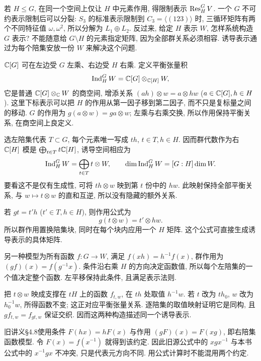 若 $H\le G$, 在同一个空间上仅让 $H$ 中元素作用, 得限制表示 $\operatorname{Res}_H^G V$. 一个 $G$ 不可约表示限制后可以分裂: $S_3$ 的标准表示限制到 $C_3=\langle(123)\rangle$ 时, 三循环矩阵有两个不同特征值 $\omega,\omega^2$, 所以分解为 $L_1\oplus L_2$. 反过来, 给定 $H$ 表示 $W$, 怎样系统构造 $G$ 表示? 不能随意给 $G\setminus H$ 的元素指定矩阵, 因为全部群关系必须相容. 诱导表示通过为每个陪集安放一份 $W$ 来解决这个问题.

$\mathbb C[G]$ 可在左边受 $G$ 左乘、右边受 $H$ 右乘. 定义平衡张量积
\[
 \operatorname{Ind}_H^G W=\mathbb C[G]\otimes_{\mathbb C[H]}W,
\]
它是普通 $\mathbb C[G]\otimes_\mathbb C W$ 的商空间, 增添关系 $(ah)\otimes w=a\otimes hw$ ($a\in\mathbb C[G],h\in H$). 这里下标表示可以把 $H$ 的作用从第一因子移到第二因子, 而不只是复标量之间的移动. $G$ 的作用为 $g(a\otimes w)=ga\otimes w$; 左乘与右乘交换, 所以作用保持平衡关系, 在商空间上良定义.

选左陪集代表 $T\subset G$, 每个元素唯一写成 $th$, $t\in T,h\in H$. 因而群代数作为右 $\mathbb C[H]$ 模是 $\bigoplus_{t\in T}t\mathbb C[H]$, 诱导空间相应为
\begin{equation}\label{eq:ind-cosets}
 \operatorname{Ind}_H^G W=\bigoplus_{t\in T}t\otimes W,\qquad
 \dim\operatorname{Ind}_H^G W=[G:H]\dim W.
\end{equation}
要看这不是仅有生成性, 可将 $th\otimes w$ 映到第 $t$ 份中的 $hw$. 此映射保持全部平衡关系, 与 $w\mapsto t\otimes w$ 的直和互逆, 所以没有隐藏的额外关系.

若 $g t=t'h$ ($t'\in T,h\in H$), 则作用公式为
\[
 g(t\otimes w)=t'\otimes hw.
\]
所以群作用置换陪集块, 同时在每个块内应用一个 $H$ 矩阵. 这个公式可直接生成诱导表示的具体矩阵.

另一种模型为所有函数 $f:G\to W$, 满足 $f(xh)=h^{-1}f(x)$, 群作用为 $(g f)(x)=f(g^{-1}x)$. 条件沿右乘 $H$ 的方向决定函数值, 所以每个左陪集的一个值决定整个函数. 左平移保持此条件, 且满足表示法则.

把 $t\otimes w$ 映成支撑在 $tH$ 上的函数 $f_{t,w}$, 在 $th$ 处取值 $h^{-1}w$. 若 $t$ 改为 $th_0$, $w$ 改为 $h_0^{-1}w$, 所得函数不变; 这正对应平衡张量关系. 逐陪集的取值映射证明它是同构, 且 $g f_{t,w}=f_{gt,w}$ 保证交织. 因而这两种构造描述同一个诱导表示.

\begin{remark}
旧讲义§4.8使用条件 $F(hx)=hF(x)$ 与作用 $(gF)(x)=F(xg)$, 即右陪集函数模型. 令 $F(x)=f(x^{-1})$ 就得到该约定. 因此旧源公式中的 $xgx^{-1}$ 与本书公式中的 $x^{-1}gx$ 不冲突, 只是代表元方向不同. 用公式计算时不能混用两个约定.
\end{remark}

